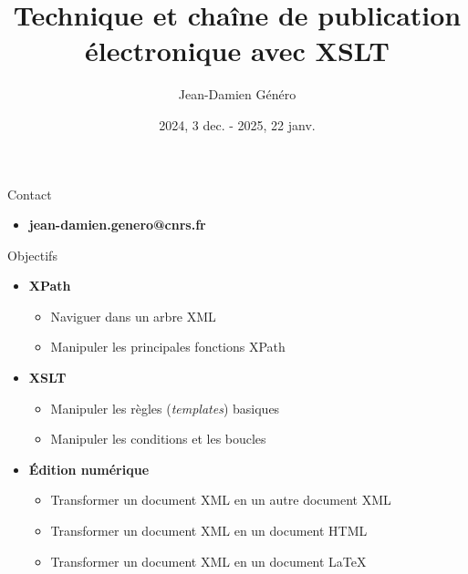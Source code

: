 \documentclass{beamer}
\title{Technique et chaîne de publication électronique avec XSLT}
\date{2024, 3 dec. - 2025, 22 janv.}
\author{Jean-Damien Généro}
\institute{École nationale des chartes -- M2 TNAH}
\begin{document}
  \maketitle
  
  \begin{frame}{Contact}
  \Large
      \begin{itemize}
          \item \textbf{jean-damien.genero@cnrs.fr}
      \end{itemize}
  \end{frame}


    \begin{frame}{Objectifs}
  \Large
      \begin{itemize}
          \item \textbf{XPath}
          \begin{itemize}
              \item Naviguer dans un arbre XML
              \item Manipuler les principales fonctions XPath
          \end{itemize}
          \item \textbf{XSLT}
          \begin{itemize}
              \item Manipuler les règles (\textit{templates}) basiques
              \item Manipuler les conditions et les boucles
          \end{itemize}
          \item \textbf{Édition numérique}
          \begin{itemize}
              \item Transformer un document XML en un autre document XML
              \item Transformer un document XML en un document HTML
              \item Transformer un document XML en un document \LaTeX
          \end{itemize}
      \end{itemize}
  \end{frame}
   
\end{document}
